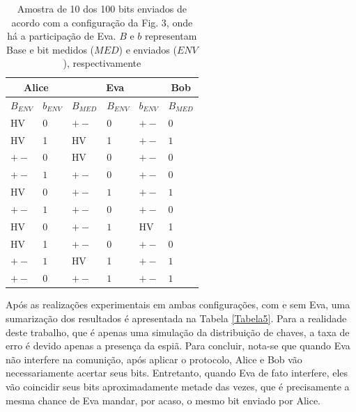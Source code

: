 \documentclass[pra, twocolumn]{revtex4}
\begin{document}
\begin{table} [H]
\begin{center}
\begin{tabular}{|p{1.0cm}|p{1.0cm}|p{1.4cm}|p{1.4cm}|p{1.4cm}|p{1.5cm}|}
\hline
\multicolumn{2}{|c|}{Alice} & \multicolumn{3}{|c|}{Eva} & \multicolumn{1}{|c|}{Bob} \\ \hline
{$B_{ENV}$} & {$b_{ENV}$} &  {$B_{MED}$} & {$B_{ENV}$} & {$b_{ENV}$} & {$B_{MED}$}\\ \hline
HV & 0 & $+-$ & $0$ & $+-$ & $0$\\ \hline
HV & 1 & HV & 1  & $+-$ & $1$ \\ \hline
$+-$ & $0$ & HV & 0 & $+-$ & $0$\\ \hline
$+-$ & $1$ & $+-$ & $0$ & $+-$ & $0$ \\ \hline
HV & 0 & $+-$ & $1$ & $+-$ & $1$ \\ \hline
$+-$ & $1$ & $+-$ & $0$ & $+-$ & $0$ \\ \hline
HV & 0 & $+-$ & $1$ & HV & 1\\ \hline
HV & 1 & $+-$ & $0$ & $+-$ & $0$ \\ \hline
$+-$ & $1$ & HV & 1  & $+-$ & $1$  \\ \hline
$+-$ & $0$ & $+-$ & $1$ & $+-$ & $1$ \\ \hline
\end{tabular}
\end{center}
\caption{Amostra de 10 dos 100 bits enviados de acordo com a configura\c c\~ao da Fig. 3, onde h\'a a participa\c c\~ao de Eva. $B$ e $b$ representam Base e bit medidos ($MED$) e enviados ($ENV$), respectivamente}
\label{tabela4}
\end{table}

Ap\'os as realiza\c c\~oes experimentais em ambas configura\c c\~oes, com e sem Eva, uma sumariza\c c\~ao dos resultados \'e apresentada na Tabela \ref{Tabela5}. Para a realidade deste trabalho, que \'e apenas uma simula\c c\~ao da distribui\c c\~ao de chaves, a taxa de erro \'e devido apenas a presen\c ca da espi\~a. Para concluir, nota-se que quando Eva n\~ao interfere na comuni\c c\~ao, ap\'os aplicar o protocolo, Alice e Bob v\~ao necessariamente acertar seus bits. Entretanto, quando Eva de fato interfere, eles v\~ao coincidir seus bits aproximadamente metade das vezes, que \'e precisamente a mesma chance de Eva mandar, por acaso, o mesmo bit enviado por Alice.
\end{document}
